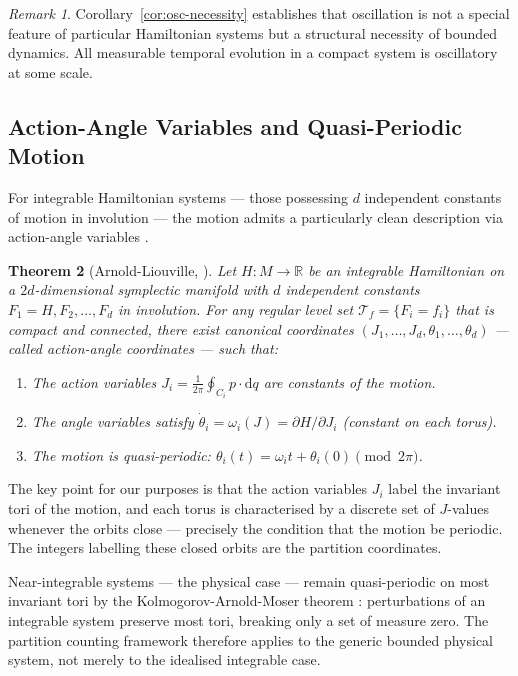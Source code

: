 \documentclass[twocolumn,10pt,a4paper]{article}
\theoremstyle{thmstyle}
\newtheorem{theorem}{Theorem}[section]
\theoremstyle{definition}
\theoremstyle{remark}
\newtheorem{remark}[theorem]{Remark}
\newcommand{\R}{\mathbb{R}}
\begin{document}
\begin{remark}
Corollary~\ref{cor:osc-necessity} establishes that oscillation is not a special feature of particular Hamiltonian systems but a structural necessity of bounded dynamics. All measurable temporal evolution in a compact system is oscillatory at some scale.
\end{remark}

\subsection{Action-Angle Variables and Quasi-Periodic Motion}

For integrable Hamiltonian systems --- those possessing $d$ independent constants of motion in involution --- the motion admits a particularly clean description via action-angle variables \citep{arnold1989,goldstein2002}.

\begin{theorem}[Arnold-Liouville, \citealp{arnold1989}]
\label{thm:al}
Let $H : M \to \R$ be an integrable Hamiltonian on a $2d$-dimensional symplectic manifold with $d$ independent constants $F_1 = H, F_2, \ldots, F_d$ in involution. For any regular level set $\mathcal{T}_f = \{F_i = f_i\}$ that is compact and connected, there exist canonical coordinates $(J_1,\ldots,J_d, \theta_1,\ldots,\theta_d)$ --- called action-angle coordinates --- such that:
\begin{enumerate}[leftmargin=1.5em,itemsep=0.2em]
\item The action variables $J_i = \frac{1}{2\pi}\oint_{C_i} p \cdot \mathrm{d}q$ are constants of the motion.
\item The angle variables satisfy $\dot{\theta}_i = \omega_i(J) = \partial H / \partial J_i$ (constant on each torus).
\item The motion is quasi-periodic: $\theta_i(t) = \omega_i t + \theta_i(0) \pmod{2\pi}$.
\end{enumerate}
\end{theorem}

The key point for our purposes is that the action variables $J_i$ label the invariant tori of the motion, and each torus is characterised by a discrete set of $J$-values whenever the orbits close --- precisely the condition that the motion be periodic. The integers labelling these closed orbits are the partition coordinates.

Near-integrable systems --- the physical case --- remain quasi-periodic on most invariant tori by the Kolmogorov-Arnold-Moser theorem \citep{kolmogorov1954,arnold1963,moser1962}: perturbations of an integrable system preserve most tori, breaking only a set of measure zero. The partition counting framework therefore applies to the generic bounded physical system, not merely to the idealised integrable case.
\end{document}

